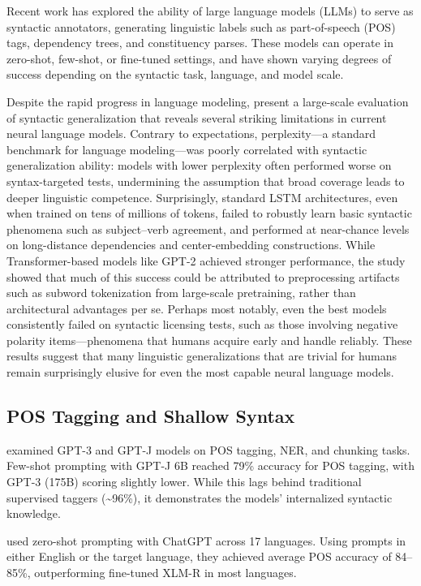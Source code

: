 Recent work has explored the ability of large language models (LLMs) to serve as syntactic annotators, generating linguistic labels such as part-of-speech (POS) tags, dependency trees, and constituency parses. These models can operate in zero-shot, few-shot, or fine-tuned settings, and have shown varying degrees of success depending on the syntactic task, language, and model scale.

Despite the rapid progress in language modeling, \citet{hu2020systematic} present a large-scale evaluation of syntactic generalization that reveals several striking limitations in current neural language models. Contrary to expectations, perplexity—a standard benchmark for language modeling—was poorly correlated with syntactic generalization ability: models with lower perplexity often performed worse on syntax-targeted tests, undermining the assumption that broad coverage leads to deeper linguistic competence. Surprisingly, standard LSTM architectures, even when trained on tens of millions of tokens, failed to robustly learn basic syntactic phenomena such as subject–verb agreement, and performed at near-chance levels on long-distance dependencies and center-embedding constructions. While Transformer-based models like GPT-2 achieved stronger performance, the study showed that much of this success could be attributed to preprocessing artifacts such as subword tokenization from large-scale pretraining, rather than architectural advantages per se. Perhaps most notably, even the best models consistently failed on syntactic licensing tests, such as those involving negative polarity items—phenomena that humans acquire early and handle reliably. These results suggest that many linguistic generalizations that are trivial for humans remain surprisingly elusive for even the most capable neural language models.

\subsection{POS Tagging and Shallow Syntax}

\citet{blevins2023llmpos} examined GPT-3 and GPT-J models on POS tagging, NER, and chunking tasks. Few-shot prompting with GPT-J 6B reached 79\% accuracy for POS tagging, with GPT-3 (175B) scoring slightly lower. While this lags behind traditional supervised taggers (\textasciitilde96\%), it demonstrates the models' internalized syntactic knowledge.

\citet{lai2023chatgptpos} used zero-shot prompting with ChatGPT across 17 languages. Using prompts in either English or the target language, they achieved average POS accuracy of 84--85\%, outperforming fine-tuned XLM-R in most languages.

